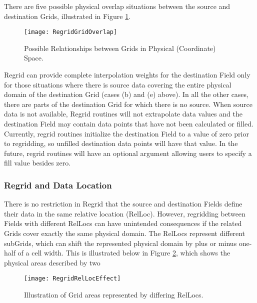 There are five possible physical overlap situations between the source and
destination Grids, illustrated in Figure \ref{fig:RegridGridOverlap}.

\begin{center}
\begin{figure}
\caption{Possible Relationships between Grids in Physical (Coordinate) Space. }
\label{fig:RegridGridOverlap}
\resizebox{\textwidth}{!}
  {\texttt{[image: RegridGridOverlap]}}
\end{figure}
\end{center}

Regrid can provide complete interpolation weights for the destination Field
only for those situations where there is source data covering the entire physical
domain of the destination Grid (cases (b) and (e) above).  In all the other
cases, there are parts of the destination Grid for which there is no source. 
When source data is not available, Regrid routines will not extrapolate data
values and the destination Field may contain data points that have not been
calculated or filled.  Currently, regrid routines initialize the destination
Field to a value of zero prior to regridding, so unfilled destination data points
will have that value.  In the future, regrid routines will have an optional
argument allowing users to specify a fill value besides zero.  


\subsubsection{Regrid and Data Location}

There is no restriction in Regrid that the source and destination Fields
define their data in the same relative location (RelLoc).  However, regridding
between Fields with different RelLocs can have unintended consequences if the
related Grids cover exactly the same physical domain.  The RelLocs represent
different subGrids, which can shift the represented physical domain by plus or
minus one-half of a cell width.  This is illustrated below in Figure 
\ref{fig:RegridRelLocEffect}, which shows the physical areas described by two

\begin{center}
\begin{figure}
\caption{Illustration of Grid areas represented by differing RelLocs. }
\label{fig:RegridRelLocEffect}
\resizebox{\textwidth}{!}
  {\texttt{[image: RegridRelLocEffect]}}
\end{figure}
\end{center}

